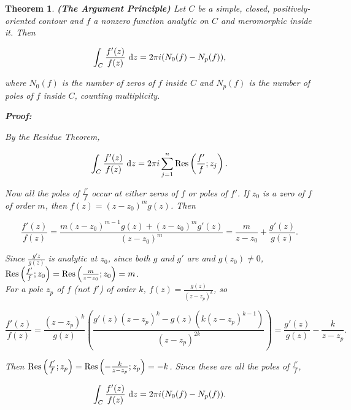 \documentclass{article}
\theoremstyle{colontheorem}
\newtheorem{theorem}{Theorem}[section]
\newcommand{\Res}{\textnormal{Res}}
\newenvironment{Theorem}
{
	\begin{mdframed}[backgroundcolor=TheoremOrange!10]
	\begin{theorem}
}
{
	\end{theorem}
	\end{mdframed}
	
	\vspace{.15in}
}
\newenvironment{Proof}
{
	\begin{mdframed}[backgroundcolor=ProofPurple!10]
	\textbf{Proof:}%
}
{
	\end{mdframed}
	
	\vspace{.085in}
}
\begin{document}
\begin{Theorem}
	
	\textbf{(The Argument Principle)} Let $C$ be a simple, closed, positively-oriented contour and $f$ a nonzero function analytic on $C$ and meromorphic inside it. Then
	
	$$
		\int_C \frac{f'(z)}{f(z)}\ \textnormal{d}z = 2 \pi i (N_0(f) - N_p(f)) \textnormal{,}
	$$
	
	where $N_0(f)$ is the number of zeros of $f$ inside $C$ and $N_p(f)$ is the number of poles of $f$ inside $C$, counting multiplicity.
	
	\begin{Proof}
		By the Residue Theorem,
		
		$$
			\int_C \frac{f'(z)}{f(z)}\ \textnormal{d}z = 2 \pi i \displaystyle\sum\limits_{j = 1}^n \Res \left( \frac{f'}{f}; z_j \right).
		$$
		
		Now all the poles of $\frac{f'}{f}$ occur at either zeros of $f$ or poles of $f'$. If $z_0$ is a zero of $f$ of order $m$, then $f(z) = (z - z_0)^m g(z)$. Then
		
		$$
			\frac{f'(z)}{f(z)} = \frac{m(z - z_0)^{m - 1} g(z) + (z - z_0)^m g'(z)}{(z - z_0)^m} = \frac{m}{z - z_0} + \frac{g'(z)}{g(z)}.
		$$
		
		Since $\frac{g'{z}}{g(z)}$ is analytic at $z_0$, since both $g$ and $g'$ are and $g(z_0) \neq 0$, $\Res \left( \frac{f'}{f}; z_0 \right) = \Res \left( \frac{m}{z - z_0}; z_0 \right) = m$.\\
		
		For a pole $z_p$ of $f$ (not $f'$) of order $k$, $f(z) = \frac{g(z)}{(z - z_p)^k}$, so
		
		$$
			\frac{f'(z)}{f(z)} = \frac{(z - z_p)^k}{g(z)} \left( \frac{g'(z)(z - z_p)^k - g(z) \left( k (z - z_p)^{k - 1} \right)}{(z - z_p)^{2k}} \right) = \frac{g'(z)}{g(z)} - \frac{k}{z - z_p}.
		$$
		
		Then $\Res \left( \frac{f'}{f}; z_p \right) = \Res \left( -\frac{k}{z - z_p}; z_p \right) = -k$. Since these are all the poles of $\frac{f'}{f}$,
		
		$$
			\int_C \frac{f'(z)}{f(z)}\ \textnormal{d}z = 2 \pi i (N_0(f) - N_p(f)).
		$$
		
	\end{Proof}
	
\end{Theorem}
\end{document}
